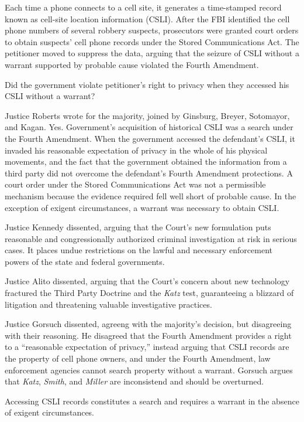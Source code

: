 \documentclass[paper=letter,fontsize=10pt]{article}
\begin{document}
	\begin{description}[align=right]
		\item[Facts] \noindent
			Each time a phone connects to a cell site, it generates a time-stamped record known as cell-site location information (CSLI).
			After the FBI identified the cell phone numbers of several robbery suspects, prosecutors were granted court orders to obtain suspects’ cell phone  records under the Stored Communications Act.
			The petitioner moved to suppress the data, arguing that the seizure of CSLI without a warrant supported by probable cause violated the Fourth Amendment.
		\item[Issue] \noindent
			Did the government violate petitioner’s right to privacy when they accessed his CSLI without a warrant?
		\item[Holding] \noindent
			Justice Roberts wrote for the majority, joined by Ginsburg, Breyer, Sotomayor, and Kagan. Yes. Government’s acquisition of historical CSLI was a search under the Fourth Amendment.
			When the government accessed the defendant’s CSLI, it invaded his reasonable expectation of privacy in the whole of his physical movements, and the fact that the government obtained the information from a third party did not overcome the defendant’s Fourth Amendment protections.
			A court order under the Stored Communications Act was not a permissible mechanism because the evidence required fell well short of probable cause. 
			In the exception of exigent circumstances, a warrant was necessary to obtain CSLI.
		\item[Dissent] \noindent
			Justice Kennedy dissented, arguing that the Court’s new formulation puts reasonable and congressionally authorized criminal investigation at risk in serious cases. It places undue restrictions on the lawful and necessary enforcement powers of the state and federal governments.\par
			Justice Alito dissented, arguing that the Court’s concern about new technology fractured the Third Party Doctrine and the \textit{Katz} test, guaranteeing a blizzard of litigation and threatening valuable investigative practices.\par
			Justice Gorsuch dissented, agreeng with the majority’s decision, but disagreeing with their reasoning. He disagreed that the Fourth Amendment provides a right to a “reasonable expectation of privacy,” instead arguing that CSLI records are the property of cell phone owners, and under the Fourth Amendment, law enforcement agencies cannot search property without a warrant. Gorsuch argues that \textit{Katz}, \textit{Smith}, and \textit{Miller} are inconsistend and should be overturned.
		\item[Rules] \noindent
			Accessing CSLI records constitutes a search and requires a warrant in the absence of exigent circumstances.
	\end{description}
\end{document}
